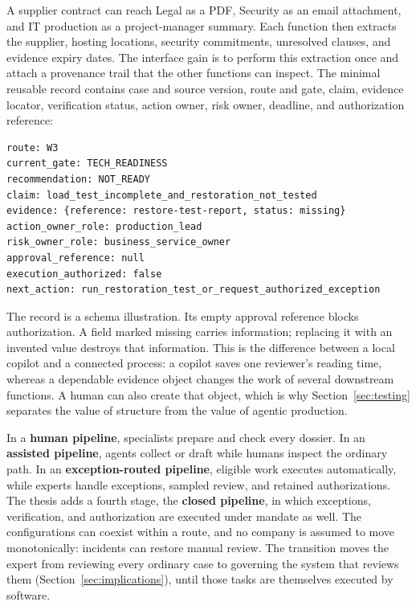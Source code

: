 A supplier contract can reach Legal as a PDF, Security as an email attachment, and IT production as a
project-manager summary. Each function then extracts the supplier, hosting locations, security
commitments, unresolved clauses, and evidence expiry dates. The interface gain is to perform this
extraction once and attach a provenance trail that the other functions can inspect. The minimal
reusable record contains case and source version, route and gate, claim, evidence locator, verification
status, action owner, risk owner, deadline, and authorization reference:
\par\noindent\begin{minipage}{\linewidth}
\begin{lstlisting}
route: W3
current_gate: TECH_READINESS
recommendation: NOT_READY
claim: load_test_incomplete_and_restoration_not_tested
evidence: {reference: restore-test-report, status: missing}
action_owner_role: production_lead
risk_owner_role: business_service_owner
approval_reference: null
execution_authorized: false
next_action: run_restoration_test_or_request_authorized_exception
\end{lstlisting}
\end{minipage}\par
The record is a schema illustration. Its empty approval reference blocks authorization. A field
marked missing carries information; replacing it with an invented value destroys that information.
This is the difference between a local copilot and a connected process: a copilot saves one reviewer's
reading time, whereas a dependable evidence object changes the work of several downstream functions. A
human can also create that object, which is why Section~\ref{sec:testing} separates the value of
structure from the value of agentic production.

In a \textbf{human pipeline}, specialists prepare and check every dossier. In an \textbf{assisted
pipeline}, agents collect or draft while humans inspect the ordinary path. In an
\textbf{exception-routed pipeline}, eligible work executes automatically, while experts handle
exceptions, sampled review, and retained authorizations. The thesis adds a fourth stage, the
\textbf{closed pipeline}, in which exceptions, verification, and authorization are executed under
mandate as well. The configurations can coexist within a route, and no company is assumed to move
monotonically: incidents can restore manual review. The transition moves the expert from reviewing every ordinary case to governing the system that
reviews them (Section~\ref{sec:implications}), until those tasks are themselves executed by software.
